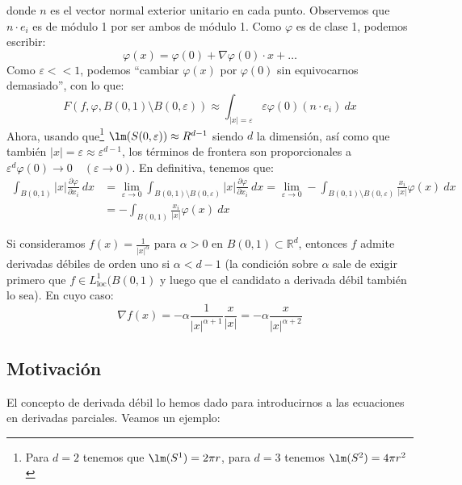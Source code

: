 \begin{ejemplo}
\begin{equation*}
    \end{equation*}
    donde $n$ es el vector normal exterior unitario en cada punto. Observemos que $n\cdot e_i$ es de módulo 1 por ser ambos de módulo 1. Como $\varphi$ es de clase 1, podemos escribir:
    \begin{equation*}
        \varphi(x) = \varphi(0) + \nabla\varphi(0)\cdot x + \ldots
    \end{equation*}
    Como $\varepsilon<<1$, podemos ``cambiar $\varphi(x)$ por $\varphi(0)$ sin equivocarnos demasiado'', con lo que:
    \begin{equation*}
        F(f,\varphi,B(0,1)\setminus B(0,\varepsilon)) \approx \int_{|x|=\varepsilon} \varepsilon\varphi(0)(n\cdot e_i)~dx
    \end{equation*}
    Ahora, usando que\footnote{Para $d=2$ tenemos que $\lm(S^1) = 2\pi r$, para $d=3$ tenemos $\lm(S^2) = 4\pi r^2$} $\lm(S(0,\varepsilon))\approx R^{d-1}$ siendo $d$ la dimensión, así como que también $|x|=\varepsilon \approx \varepsilon^{d-1}$, los términos de frontera son proporcionales a $\varepsilon^d\varphi(0)\to 0 \quad (\varepsilon\to0)$. En definitiva, tenemos que:
    \begin{align*}
        \int_{B(0,1)}|x|\frac{\partial \varphi}{\partial x_i}~dx &= \lim_{\varepsilon\to0}\int_{B(0,1)\setminus B(0,\varepsilon)}|x|\frac{\partial \varphi}{\partial x_i}~dx = \lim_{\varepsilon\to0} -\int_{B(0,1)\setminus B(0,\varepsilon)} \frac{x_i}{|x|}\varphi(x)~dx  \\ &= - \int_{B(0,1)}\frac{x_i}{|x|}\varphi(x)~dx
    \end{align*}
\end{ejemplo}

\begin{ejercicio}
    Si consideramos $f(x) = \frac{1}{|x|^\alpha}$ para $\alpha>0$ en $B(0,1)\subset\mathbb{R}^d$, entonces $f$ admite derivadas débiles de orden uno si $\alpha<d-1$ (la condición sobre $\alpha$ sale de exigir primero que $f\in L^1_{\text{loc}}(B(0,1)$ y luego que el candidato a derivada débil también lo sea). En cuyo caso:
    \begin{equation*}
        \nabla f(x) = -\alpha \frac{1}{|x|^{\alpha+1}} \frac{x}{|x|} = -\alpha \frac{x}{|x|^{\alpha+2}}
    \end{equation*}
\end{ejercicio}

\subsection{Motivación}
\noindent
El concepto de derivada débil lo hemos dado para introducirnos a las ecuaciones en derivadas parciales. Veamos un ejemplo:

